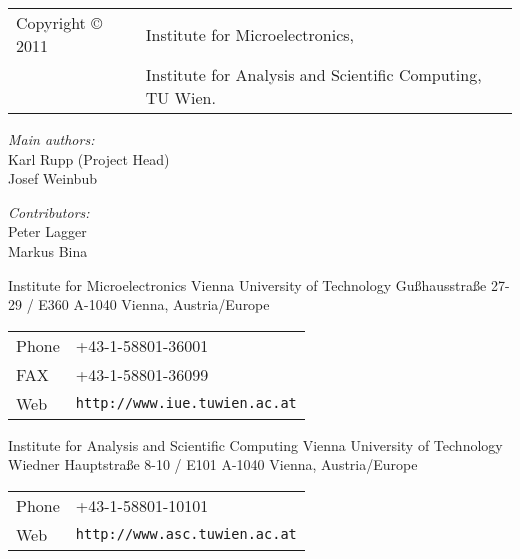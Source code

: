 
\clearpage

\begin{tabular}{ll}
Copyright {\copyright} 2011 & Institute for Microelectronics, \\
                            & Institute for Analysis and Scientific Computing, TU Wien.
\end{tabular}

\vspace{3.5cm}

\textit{Main authors:}\\ 

Karl Rupp (Project Head)\\
Josef Weinbub \\

\vspace{1cm}

\textit{Contributors:}\\ 

Peter Lagger \\
Markus Bina


\vspace{3.0cm}

Institute for Microelectronics\newline
Vienna University of Technology\newline
Gu\ss hausstra\ss e 27-29 / E360\newline
A-1040 Vienna, Austria/Europe\newline

\begin{tabular}{ll}
Phone  & +43-1-58801-36001\\
FAX    & +43-1-58801-36099\\
Web    & \texttt{http://www.iue.tuwien.ac.at}
\end{tabular}

\vspace{1.5cm}

Institute for Analysis and Scientific Computing\newline
Vienna University of Technology\newline
Wiedner Hauptstra\ss e 8-10 / E101\newline
A-1040 Vienna, Austria/Europe\newline

\begin{tabular}{ll}
Phone  & +43-1-58801-10101\\
Web    & \texttt{http://www.asc.tuwien.ac.at}
\end{tabular}





